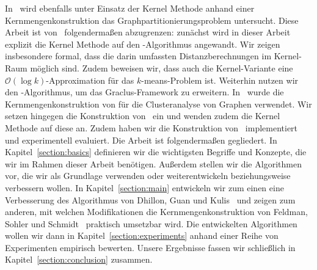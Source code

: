 In~\cite{Swierkot08} wird ebenfalls unter Einsatz der Kernel Methode anhand einer Kernmengenkonstruktion das
Graphpartitionierungsproblem untersucht. Diese Arbeit ist von~\cite{Swierkot08} folgendermaßen abzugrenzen: zunächst wird in dieser
Arbeit explizit die Kernel Methode auf den \kmpp-Algorithmus angewandt. Wir zeigen insbesondere formal, dass die darin umfassten
Distanzberechnungen im Kernel-Raum möglich sind. Zudem beweisen wir, dass auch die Kernel-Variante \kkmpp{} eine
$\mathcal{O}(\log k)$-Approximation für das $k$-means-Problem ist. Weiterhin nutzen wir den \kkmpp-Algorithmus, um das
Graclus-Framework zu erweitern. In~\cite{Swierkot08} wurde die Kernmengenkonstruktion von \Skmpp{} für die Clusteranalyse von
Graphen verwendet. Wir setzen hingegen die Konstruktion von~\cite{FeldmanSS13} ein und wenden zudem die Kernel Methode auf
diese an. Zudem haben wir die Konstruktion von~\cite{FeldmanSS13} implementiert und experimentell evaluiert.
\absatz
Die Arbeit ist folgendermaßen gegliedert. In Kapitel~\ref{section:basics} definieren wir die wichtigsten Begriffe und
Konzepte, die wir im Rahmen dieser Arbeit benötigen. Außerdem stellen wir die Algorithmen vor, die wir als Grundlage verwenden
oder weiterentwickeln beziehungsweise verbessern wollen. In Kapitel~\ref{section:main} entwickeln wir zum einen eine
Verbesserung des Algorithmus von Dhillon, Guan und Kulis~\cite{DhillonGK04,DhillonGK07} und zeigen zum anderen, mit welchen
Modifikationen die Kernmengenkonstruktion von Feldman, Sohler und Schmidt~\cite{FeldmanSS13,Schmidt14} praktisch umsetzbar wird.
Die entwickelten Algorithmen wollen wir dann in Kapitel~\ref{section:experiments} anhand einer Reihe von Experimenten empirisch
bewerten. Unsere Ergebnisse fassen wir schließlich in Kapitel~\ref{section:conclusion} zusammen.